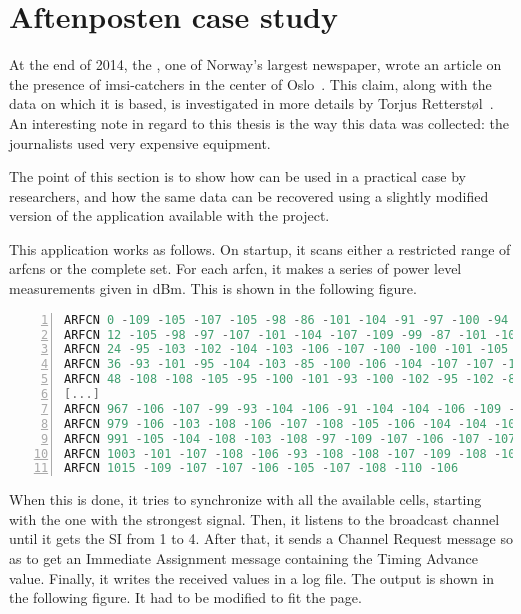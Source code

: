 \chapter{Aftenposten case study}

    At the end of 2014, the , one of Norway's largest
    newspaper, wrote an article on the presence of \gls{imsi}-catchers
    in the center of Oslo~\cite{timberg_for_2014}. This claim, along
    with the data on which it is based, is investigated in more details
    by Torjus Retterstøl~\cite{torjus}. An interesting note in
    regard to this thesis is the way this data was collected: the
    journalists used very expensive equipment.

    The point of this section is to show how  can be
    used in a practical case by researchers, and how the same data can
    be recovered using a slightly modified version of the
     application available with the 
    project.

      This application works as follows. On startup, it scans either a
      restricted range of \gls{arfcn}s or the complete set. For each
      \gls{arfcn}, it makes a series of power level measurements given
      in dBm. This is shown in the following figure.

      \begin{lstlisting}[language=C, numbers=left,
      basicstyle=\footnotesize, breaklines=true, frame=single]
ARFCN 0 -109 -105 -107 -105 -98 -86 -101 -104 -91 -97 -100 -94
ARFCN 12 -105 -98 -97 -107 -101 -104 -107 -109 -99 -87 -101 -103
ARFCN 24 -95 -103 -102 -104 -103 -106 -107 -100 -100 -101 -105 -107
ARFCN 36 -93 -101 -95 -104 -103 -85 -100 -106 -104 -107 -107 -105
ARFCN 48 -108 -108 -105 -95 -100 -101 -93 -100 -102 -95 -102 -87
[...]
ARFCN 967 -106 -107 -99 -93 -104 -106 -91 -104 -104 -106 -109 -106
ARFCN 979 -106 -103 -108 -106 -107 -108 -105 -106 -104 -104 -104 -105
ARFCN 991 -105 -104 -108 -103 -108 -97 -109 -107 -106 -107 -107 -107
ARFCN 1003 -101 -107 -108 -106 -93 -108 -108 -107 -109 -108 -109 -107
ARFCN 1015 -109 -107 -107 -106 -105 -107 -108 -110 -106
      \end{lstlisting}

      When this is done, it tries to synchronize with all the available
      cells, starting with the one with the strongest signal. Then, it
      listens to the broadcast channel until it gets the SI from 1 to 4.
      After that, it sends a Channel Request message so as to get an
      Immediate Assignment message containing the Timing Advance value.
      Finally, it writes the received values in a log file. The output
      is shown in the following figure. It had to be modified to fit the
      page.\\

